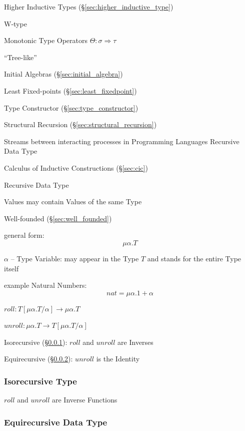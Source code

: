 \fist Higher Inductive Types (\S\ref{sec:higher_inductive_type})

W-type

Monotonic Type Operators $\Theta : \sigma \Rightarrow \tau$

``Tree-like''

Initial Algebras (\S\ref{sec:initial_algebra})

Least Fixed-points (\S\ref{sec:least_fixedpoint})

Type Constructor (\S\ref{sec:type_constructor})

Structural Recursion (\S\ref{sec:structural_recursion})

Streams between interacting processes in Programming Languages
Recursive Data Type

Calculus of Inductive Constructions (\S\ref{sec:cic})


\asterism

Recursive Data Type

Values may contain Values of the same Type

Well-founded (\S\ref{sec:well_founded})

general form:
\[
  \mu\alpha.T
\]

$\alpha$ -- Type Variable: may appear in the Type $T$ and stands for
the entire Type itself

example Natural Numbers:
\[
  nat = \mu\alpha.1 + \alpha
\]

$roll : T[\mu\alpha.T/\alpha] \rightarrow \mu\alpha.T$

$unroll : \mu\alpha.T \rightarrow T[\mu\alpha.T/\alpha]$

Isorecursive (\S\ref{sec:isorecursive_type}): $roll$ and $unroll$
are Inverses

Equirecursive (\S\ref{sec:equirecursive_type}): $unroll$ is the
Identity



\subsubsection{Isorecursive Type}\label{sec:isorecursive_type}

$roll$ and $unroll$ are Inverse Functions



\subsubsection{Equirecursive Data Type}\label{sec:equirecursive_type}

